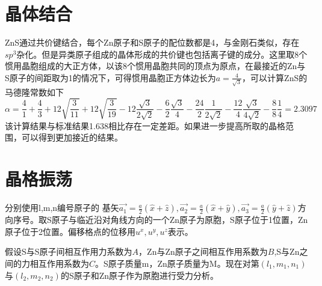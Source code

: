 \documentclass{article}
\begin{document}
\section{晶体结合}
ZnS通过共价键结合，每个Zn原子和S原子的配位数都是4，与金刚石类似，存在$ sp^3 $杂化。但是异类原子组成的晶体形成的共价键也包括离子键的成分。这里取8个惯用晶胞组成的大正方体，以该8个惯用晶胞共同的顶点为原点，在最接近的Zn与S原子的间距取为1的情况下，可得惯用晶胞正方体边长为$ a=\frac{4}{\sqrt{3}} $，可以计算ZnS的马德隆常数如下
\begin{equation}
	\alpha=\frac{4}{1}+\frac{4}{3}+12\sqrt{\frac{3}{11}}+12\sqrt{\frac{3}{19}}-12\frac{\sqrt{3}}{2\sqrt{2}}-\frac{6}{2}\frac{\sqrt{3}}{4}-\frac{24}{2}\frac{1}{2\sqrt{2}}-\frac{12}{4}\frac{\sqrt{3}}{4\sqrt{2}}-\frac{8}{8}\frac{1}{4}=2.3097
\end{equation}
该计算结果与标准结果1.638相比存在一定差距。如果进一步提高所取的晶格范围，可以得到更加接近的结果。
\section{晶格振荡}
分别使用l,m,n编号原子的
基矢$ \vec{a_1}=\frac{a}{2}(\hat{x}+\hat{z}),\vec{a_2}=\frac{a}{2}(\hat{x}+\hat{y}),\vec{a_3}=\frac{a}{2}(\hat{y}+\hat{z}) $方向序号。取S原子与临近沿对角线方向的一个Zn原子为原胞，S原子位于1位置，Zn原子位于2位置。偏移格点的位移用$ u^x,u^y,u^z $表示。


假设S与S原子间相互作用力系数为$ A $，Zn与Zn原子之间相互作用系数为$ B $,S与Zn之间的力相互作用系数为$ C $。S原子质量m，Zn原子质量为M。现在对第$ (l_1,m_1,n_1) $与$ (l_2,m_2,n_2) $的S原子和Zn原子作为原胞进行受力分析。
\end{document}
